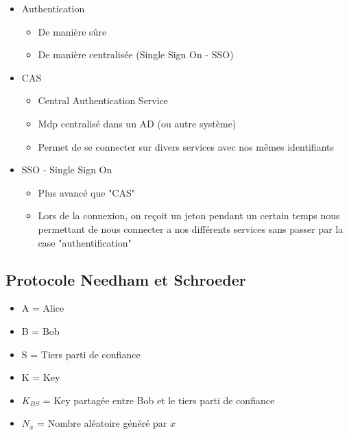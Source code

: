 \documentclass[a4paper]{article}
\begin{document}
      \begin{itemize}[label = \textbullet, font = \Large]
        \item Authentication
        \begin{itemize}[label=, font=\scriptsize]
          \item De manière sûre
          \item De manière centralisée (Single Sign On - SSO)
        \end{itemize}
        \item CAS
        \begin{itemize}[label=, font=\scriptsize]
          \item Central Authentication Service
          \item Mdp centralisé dans un AD (ou autre système)
          \item Permet de se connecter sur divers services avec nos mêmes identifiants
        \end{itemize}
        \item SSO - Single Sign On
        \begin{itemize}[label=, font=\scriptsize]
          \item Plus avancé que "CAS"
          \item Lors de la connexion, on reçoit un jeton pendant un certain temps nous permettant de nous connecter a nos différents services sans passer par la case "authentification"
        \end{itemize}
      \end{itemize}

      \subsection{Protocole Needham et Schroeder}

      \begin{itemize}[label = \textbullet, font = \Large]
        \item A = Alice
        \item B = Bob
        \item S = Tiers parti de confiance
        \item K = Key
        \item $K_{BS}$ = Key partagée entre Bob et le tiers parti de confiance
        \item $N_x$ = Nombre aléatoire généré par $x$
      \end{itemize}
\end{document}
